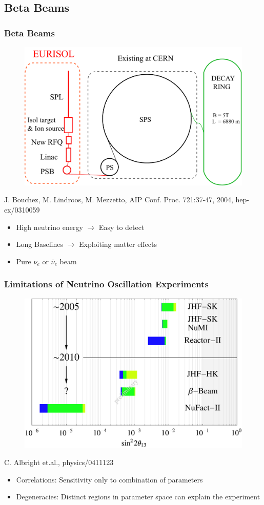 \documentclass{beamer}
\newcommand{\reference}[1]{\tiny #1 \normalsize}
\begin{document}
\subsection{Beta Beams}

\begin{frame}
  \frametitle{Beta Beams}
  \begin{figure}
    \includegraphics[height=5 cm]{fig/cern_betabeam.pdf}
  \end{figure}
  \begin{flushright}
    \reference{J. Bouchez, M. Lindroos, M. Mezzetto, AIP Conf. Proc. 721:37-47, 2004, hep-ex/0310059}
  \end{flushright}
  \begin{itemize}
    \item High neutrino energy $\longrightarrow$ Easy to detect
    \item Long Baselines $\longrightarrow$ Exploiting matter effects
    \item Pure $\nu_e$ or $\bar{\nu}_e$ beam
  \end{itemize}
\end{frame}

\begin{frame}
  \frametitle{Limitations of Neutrino Oscillation Experiments}
  \begin{figure}
    \includegraphics[height=5 cm]{fig/barplots.pdf}
  \end{figure}
  \begin{flushright}
    \reference{C. Albright et.al., physics/0411123}
  \end{flushright}
  \begin{itemize}
    \item Correlations: Sensitivity only to combination of parameters
    \item Degeneracies: Distinct regions in parameter space can explain the experiment
  \end{itemize}
\end{frame}
\end{document}
